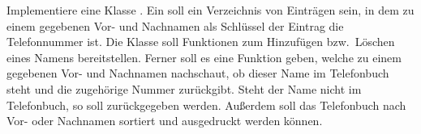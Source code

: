 \begin{aufg}
  Implementiere eine Klasse .
  Ein  soll ein Verzeichnis von Einträgen sein, in dem zu einem
  gegebenen Vor- und Nachnamen als Schlüssel der Eintrag die Telefonnummer ist.
  Die Klasse soll Funktionen zum Hinzufügen bzw.\ Löschen eines Namens
  bereitstellen.
  Ferner soll es eine Funktion geben, welche zu einem gegebenen Vor- und Nachnamen nachschaut,
  ob dieser Name im Telefonbuch steht und die zugehörige Nummer zurückgibt.
  Steht der Name nicht im Telefonbuch, so soll  zurückgegeben werden.
  Außerdem soll das Telefonbuch nach Vor- oder Nachnamen sortiert und ausgedruckt werden können.
\end{aufg}
